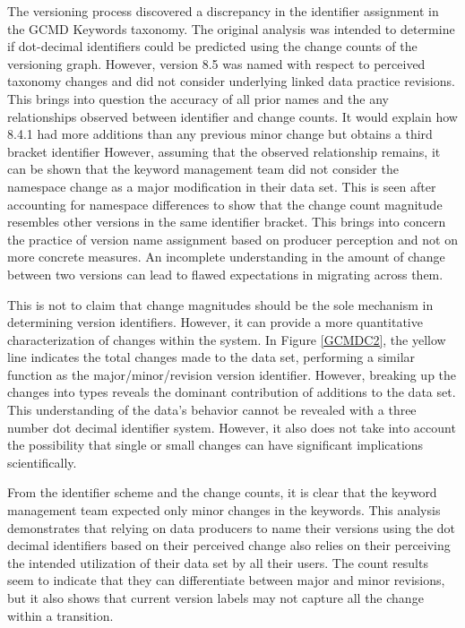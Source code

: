 The versioning process discovered a discrepancy in the identifier assignment in the GCMD Keywords taxonomy.
The original analysis was intended to determine if dot-decimal identifiers could be predicted using the change counts of the versioning graph.
However, version 8.5 was named with respect to perceived taxonomy changes and did not consider underlying linked data practice revisions.
This brings into question the accuracy of all prior names and the any relationships observed between identifier and change counts.
It would explain how 8.4.1 had more additions than any previous minor change but obtains a third bracket identifier
However, assuming that the observed relationship remains, it can be shown that the keyword management team did not consider the namespace change as a major modification in their data set.
This is seen after accounting for namespace differences to show that the change count magnitude resembles other versions in the same identifier bracket.
This brings into concern the practice of version name assignment based on producer perception and not on more concrete measures.
An incomplete understanding in the amount of change between two versions can lead to flawed expectations in migrating across them.

This is not to claim that change magnitudes should be the sole mechanism in determining version identifiers.
However, it can provide a more quantitative characterization of changes within the system.
In Figure \ref{GCMDC2}, the yellow line indicates the total changes made to the data set, performing a similar function as the major/minor/revision version identifier.
However, breaking up the changes into types reveals the dominant contribution of additions to the data set.
This understanding of the data's behavior cannot be revealed with a three number dot decimal identifier system.
However, it also does not take into account the possibility that single or small changes can have significant implications scientifically.

From the identifier scheme and the change counts, it is clear that the keyword management team expected only minor changes in the keywords.
This analysis demonstrates that relying on data producers to name their versions using the dot decimal identifiers based on their perceived change also relies on their perceiving the intended utilization of their data set by all their users.
The count results seem to indicate that they can differentiate between major and minor revisions, but it also shows that current version labels may not capture all the change within a transition.

